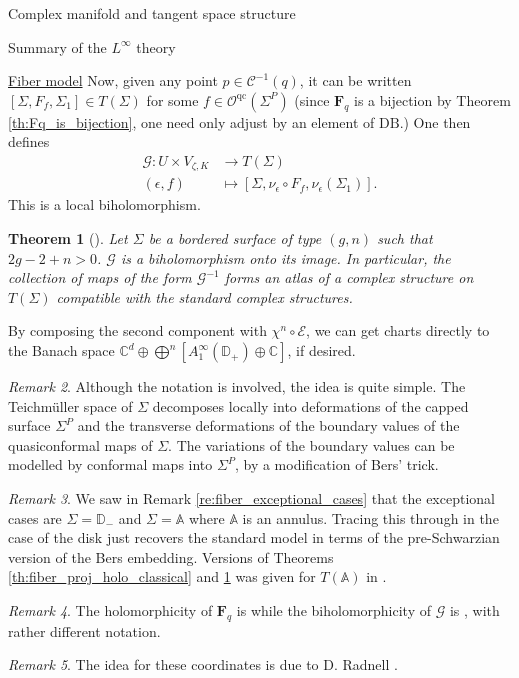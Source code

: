 \documentclass[12pt]{amsart}
\newcommand{\disk}{\ensuremath{\mathbb{D}} } %
\newcommand{\riem}{\Sigma}  %
\theoremstyle{plain}
\newtheorem{theorem}{Theorem}[section]
\theoremstyle{definition}
\theoremstyle{remark}
\newtheorem{remark}[theorem]{Remark}
\numberwithin{equation}{section} %
\numberwithin{figure}{section} %
\begin{document}
\begin{section}{Complex manifold and tangent space structure}
\begin{subsection}{Summary of the $L^\infty$ theory}
\begin{subsubsection}{\underline{Fiber model}}
Now, given any point $p \in \mathcal{C}^{-1}(q)$, it can be written $[\riem,F_f,\riem_1] \in  {T}(\riem)$ for some $f \in \mathcal{O}^{\mathrm{qc}}(\riem^P)$ (since $\mathbf{F}_q$ is a bijection by Theorem \ref{th:Fq_is_bijection}, one need only adjust by an element of $\mathrm{DB}$.)   One then defines 
\begin{align} \label{eq:fiber_coordinates_definition}
    \mathcal{G}: U \times V_{\zeta,K} & \rightarrow T(\riem) \nonumber \\
    (\epsilon,f) & \mapsto   [\riem,\nu_\epsilon \circ F_f,\nu_\epsilon(\riem_1)]. 
\end{align}
This is a local biholomorphism.
\begin{theorem}[\cite{RadnellSchippers_fiber}] \label{th:fiber_coordinates_classical}
Let $\riem$ be a bordered surface of type $(g,n)$ such that $2g-2+n>0$. 
 $\mathcal{G}$ is a biholomorphism onto its image. In particular, the collection of maps of the form $\mathcal{G}^{-1}$ forms an atlas of a complex structure on $T(\riem)$ compatible with the standard complex structures. 
\end{theorem}

By composing the second component with $\chi^n \circ \mathcal{E}$, we can get charts directly to the Banach space $\mathbb{C}^d \oplus \bigoplus^n \left[ A_1^\infty(\disk_+) \oplus \mathbb{C} \right]$, if desired. 

\begin{remark} 
 Although the notation is involved, the idea is quite simple.  The Teichm\"uller space of $\riem$ decomposes locally into deformations of the capped surface $\riem^P$ and the transverse deformations of the boundary values of the quasiconformal maps of $\riem$.  
 The variations of the boundary values can be modelled by conformal maps into $\riem^P$, by a modification of Bers' trick.
\end{remark}
\begin{remark}  We saw in Remark \ref{re:fiber_exceptional_cases} that the exceptional cases are $\riem=\disk_-$ and $\riem=\mathbb{A}$ where $\mathbb{A}$ is an annulus. Tracing this through in the case of the disk just recovers the standard model in terms of the pre-Schwarzian version of the Bers embedding. Versions of Theorems \ref{th:fiber_proj_holo_classical} and \ref{th:fiber_coordinates_classical} was given for $T(\mathbb{A})$ in \cite{RadnellSchippers_annulus}. 
\end{remark}
\begin{remark}
 The holomorphicity of $\mathbf{F}_q$ is \cite[Corollary 3.3]{RadnellSchippers_fiber} while the biholomorphicity of $\mathcal{G}$ is \cite[Theorem 4.1]{RadnellSchippers_fiber}, with rather different notation. 
\end{remark}
\begin{remark}
 The idea for these coordinates is due to D. Radnell \cite{Radnell_thesis}. 
\end{remark}
 

\end{subsubsection}
\end{subsection}
\end{section}
\end{document}
